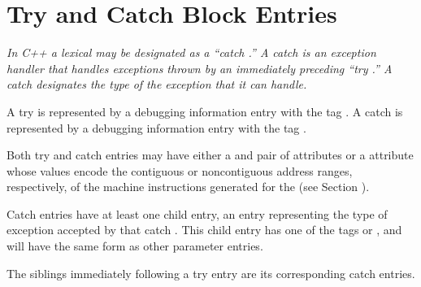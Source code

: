 \section{Try and Catch Block Entries}
\label{chap:tryandcatchblockentries}

\textit{In C++ a lexical  may be 
designated as a ``catch .'' 
A catch  is an 
exception handler that handles
exceptions thrown by an immediately 
preceding ``try .''
A catch  
designates the type of the exception that it
can handle.}

A try  is represented 
by a debugging information entry
with the tag .  
A catch  is represented by
a debugging information entry with 
the tag .

Both try and catch  entries may have either a
 and  pair of attributes or a
 attribute whose values encode the contiguous
or non\dash contiguous address ranges, respectively, of the
machine instructions generated for the 
(see Section
).

Catch  entries have at 
least one child entry, an
entry representing the type of exception accepted by
that catch . 
This child entry has one of the tags
 or ,
and will have the same form as other parameter entries.

The siblings immediately following 
a try  entry are its
corresponding catch  entries.







